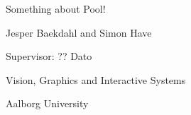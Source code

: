 \begin{titlingpage}
  \thispagestyle{empty}
  \centering
  { \setlength{\baselineskip}{24pt}
    {\Huge Something about Pool!
    }\par
    \par\vspace*{4\onelineskip}
    \par




    \par\vspace*{2\onelineskip}
	\par\par
    \par
    
    \large Jesper Baekdahl and Simon Have
  }
  \vfill
  \vspace*{2\onelineskip}
  Supervisor: ??\hfill
  Dato
  \par\vspace*{2\onelineskip}
  \small
  Vision, Graphics and Interactive Systems\par
  Aalborg University
  \enlargethispage{2\onelineskip}
\end{titlingpage}

